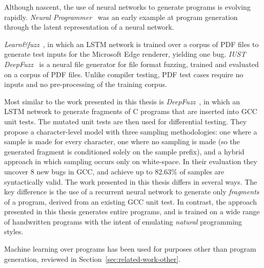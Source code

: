 Although nascent, the use of neural networks to generate programs is evolving rapidly. \emph{Neural Programmer}~\cite{Neelakantan2016} was an early example at program generation through the latent representation of a neural network.

\emph{Learn\&fuzz}~\cite{Godefroid2017}, in which an LSTM network is trained over a corpus of PDF files to generate test inputs for the Microsoft Edge renderer, yielding one bug.
\emph{IUST DeepFuzz}~\cite{Nasrabadi2018} is a neural file generator for file format fuzzing, trained and evaluated on a corpus of PDF files. Unlike compiler testing, PDF test cases require no inputs and no pre-processing of the training corpus.

Most similar to the work presented in this thesis is \emph{DeepFuzz}~\cite{Liu2019}, in which an LSTM network to generate fragments of C programs that are inserted into GCC unit tests. The mutated unit tests are then used for differential testing. They propose a character-level model with three sampling methodologies: one where a sample is made for every character, one where no sampling is made (so the generated fragment is conditioned solely on the sample prefix), and a hybrid approach in which sampling occurs only on white-space. In their evaluation they uncover 8 new bugs in GCC, and achieve up to 82.63\% of samples are syntactically valid. The work presented in this thesis differs in several ways. The key difference is the use of a recurrent neural network to generate only \emph{fragments} of a program, derived from an existing GCC unit test. In contrast, the approach presented in this thesis generates entire programs, and is trained on a wide range of handwritten programs with the intent of emulating \emph{natural} programming styles.

Machine learning over programs has been used for purposes other than program generation, reviewed in Section~\ref{sec:related-work-other}.
